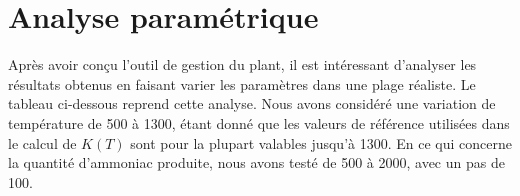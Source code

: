 \section{Analyse paramétrique}

Après avoir conçu l'outil de gestion du plant, il est intéressant d'analyser les résultats obtenus en faisant varier les 
paramètres dans une plage réaliste. Le tableau ci-dessous reprend cette analyse. Nous avons considéré une variation de 
température de \unit{500}{\kelvin} à \unit{1300}{\kelvin}, étant donné que les valeurs de référence utilisées dans le 
calcul de $K(T)$ sont pour la plupart valables jusqu'à \unit{1300}{\kelvin}. En ce qui concerne la quantité d'ammoniac 
produite, nous avons testé de \unit{500}{\ton} à \unit{2000}{\ton}, avec un pas de \unit{100}{\ton}.

